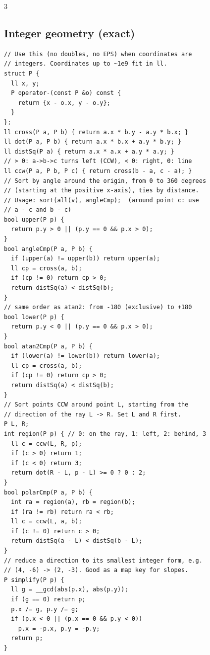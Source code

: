 \documentclass[8pt, a4paper]{article}
\begin{document}
\begin{multicols*}{3}
\subsection{Integer geometry (exact)}
\begin{lstlisting}
// Use this (no doubles, no EPS) when coordinates are
// integers. Coordinates up to ~1e9 fit in ll.
struct P {
  ll x, y;
  P operator-(const P &o) const {
    return {x - o.x, y - o.y};
  }
};
ll cross(P a, P b) { return a.x * b.y - a.y * b.x; }
ll dot(P a, P b) { return a.x * b.x + a.y * b.y; }
ll distSq(P a) { return a.x * a.x + a.y * a.y; }
// > 0: a->b->c turns left (CCW), < 0: right, 0: line
ll ccw(P a, P b, P c) { return cross(b - a, c - a); }
// Sort by angle around the origin, from 0 to 360 degrees
// (starting at the positive x-axis), ties by distance.
// Usage: sort(all(v), angleCmp);  (around point c: use
// a - c and b - c)
bool upper(P p) {
  return p.y > 0 || (p.y == 0 && p.x > 0);
}
bool angleCmp(P a, P b) {
  if (upper(a) != upper(b)) return upper(a);
  ll cp = cross(a, b);
  if (cp != 0) return cp > 0;
  return distSq(a) < distSq(b);
}
// same order as atan2: from -180 (exclusive) to +180
bool lower(P p) {
  return p.y < 0 || (p.y == 0 && p.x > 0);
}
bool atan2Cmp(P a, P b) {
  if (lower(a) != lower(b)) return lower(a);
  ll cp = cross(a, b);
  if (cp != 0) return cp > 0;
  return distSq(a) < distSq(b);
}
// Sort points CCW around point L, starting from the
// direction of the ray L -> R. Set L and R first.
P L, R;
int region(P p) { // 0: on the ray, 1: left, 2: behind, 3
  ll c = ccw(L, R, p);
  if (c > 0) return 1;
  if (c < 0) return 3;
  return dot(R - L, p - L) >= 0 ? 0 : 2;
}
bool polarCmp(P a, P b) {
  int ra = region(a), rb = region(b);
  if (ra != rb) return ra < rb;
  ll c = ccw(L, a, b);
  if (c != 0) return c > 0;
  return distSq(a - L) < distSq(b - L);
}
// reduce a direction to its smallest integer form, e.g.
// (4, -6) -> (2, -3). Good as a map key for slopes.
P simplify(P p) {
  ll g = __gcd(abs(p.x), abs(p.y));
  if (g == 0) return p;
  p.x /= g, p.y /= g;
  if (p.x < 0 || (p.x == 0 && p.y < 0))
    p.x = -p.x, p.y = -p.y;
  return p;
}
\end{lstlisting}

\end{multicols*}
\end{document}
